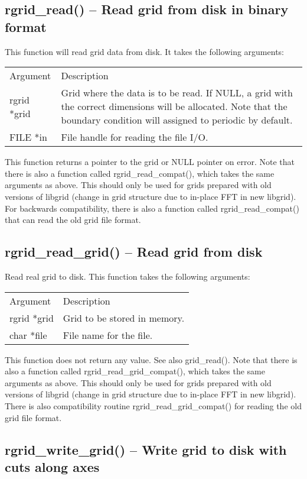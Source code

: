 \documentclass[12pt,letterpaper]{report}
\begin{document}
\subsection{rgrid\_read() -- Read grid from disk in binary format}

This function will read grid data from disk. It takes the following arguments:
\begin{longtable}{p{} p{}}
Argument & Description\\
\cline{1-2}
rgrid *grid & Grid where the data is to be read. If NULL, a grid with the correct dimensions will be allocated. Note that the boundary condition will assigned to periodic by default.\\
FILE *in & File handle for reading the file I/O.\\
\end{longtable}
This function returns a pointer to the grid or NULL pointer on error. Note that there is also a function called rgrid\_read\_compat(), which takes the same arguments as above. This should only be used for grids prepared with old versions of libgrid (change in grid structure due to in-place FFT in new libgrid). For backwards compatibility, there is also a function called rgrid\_read\_compat() that can read the old grid file format. 

\subsection{rgrid\_read\_grid() -- Read grid from disk}

Read real grid to disk. This function takes the following arguments:
\begin{longtable}{p{} p{}}
Argument & Description\\
\cline{1-2}
rgrid *grid & Grid to be stored in memory.\\
char *file & File name for the file.\\
\end{longtable}
\noindent
This function does not return any value. See also grid\_read(). Note that there is also a function called rgrid\_read\_grid\_compat(), which takes the same arguments as above. This should only be used for grids prepared with old versions of libgrid (change in grid structure due to in-place FFT in new libgrid). There is also compatibility routine rgrid\_read\_grid\_compat() for reading the old grid file format.

\subsection{rgrid\_write\_grid() -- Write grid to disk with cuts along axes}
\end{document}
